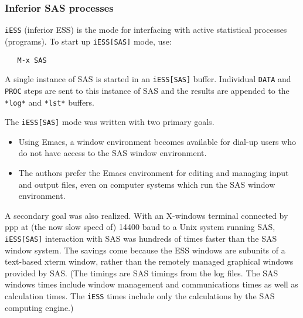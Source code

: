 \documentclass{article}
\begin{document}
% 
% 

\subsubsection{Inferior SAS processes}
\label{sec:SAS:proc:inf}

\texttt{iESS} (inferior ESS) is the mode for interfacing with active
statistical processes (programs).  To start up \texttt{iESS[SAS]} mode, use:
\begin{verbatim}
   M-x SAS
\end{verbatim}   
A single instance of SAS is started in an \texttt{iESS[SAS]} buffer.  Individual
\texttt{DATA} and \texttt{PROC} steps are sent to this instance of SAS and the results
are appended to the \texttt{*log*} and \texttt{*lst*} buffers.

The \texttt{iESS[SAS]} mode was written with two primary goals.
\begin{itemize}
\item Using Emacs, a window environment becomes available for dial-up
  users who do not have access to the SAS window environment.
\item The authors prefer the Emacs environment for editing and
  managing input and output files, even on computer systems which run
  the SAS window environment.
\end{itemize}
A secondary goal was also realized.  With an X-windows
terminal connected by ppp at (the now slow speed of)
14400 baud to a Unix system running SAS,
\texttt{iESS[SAS]} interaction with SAS was hundreds of times faster than the
SAS window system.  The savings come because the ESS windows are
subunits of a text-based xterm window, rather than the remotely
managed graphical windows provided by SAS.  (The timings are SAS
timings from the log files.  The SAS windows times include window
management and communications times as well as calculation times.  The
\texttt{iESS} times include only the calculations by the SAS computing engine.)
\end{document}
